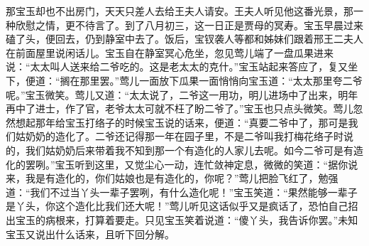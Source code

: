 \begin{parag}
    那宝玉却也不出房门，天天只差人去给王夫人请安。王夫人听见他这番光景，那一种欣慰之情，更不待言了。到了八月初三，这一日正是贾母的冥寿。宝玉早晨过来磕了头，便回去，仍到静室中去了。饭后，宝钗袭人等都和姊妹们跟着邢王二夫人在前面屋里说闲话儿。宝玉自在静室冥心危坐，忽见莺儿端了一盘瓜果进来说：“太太叫人送来给二爷吃的。这是老太太的克什。”宝玉站起来答应了，复又坐下，便道：“搁在那里罢。”莺儿一面放下瓜果一面悄悄向宝玉道：“太太那里夸二爷呢。”宝玉微笑。莺儿又道：“太太说了，二爷这一用功，明儿进场中了出来，明年再中了进士，作了官，老爷太太可就不枉了盼二爷了。”宝玉也只点头微笑。莺儿忽然想起那年给宝玉打络子的时候宝玉说的话来，便道：“真要二爷中了，那可是我们姑奶奶的造化了。二爷还记得那一年在园子里，不是二爷叫我打梅花络子时说的，我们姑奶奶后来带着我不知到那一个有造化的人家儿去呢。如今二爷可是有造化的罢咧。”宝玉听到这里，又觉尘心一动，连忙敛神定息，微微的笑道：“据你说来，我是有造化的，你们姑娘也是有造化的，你呢？”莺儿把脸飞红了，勉强道：“我们不过当丫头一辈子罢咧，有什么造化呢！”宝玉笑道：“果然能够一辈子是丫头，你这个造化比我们还大呢！”莺儿听见这话似乎又是疯话了，恐怕自己招出宝玉的病根来，打算着要走。只见宝玉笑着说道：“傻丫头，我告诉你罢。”未知宝玉又说出什么话来，且听下回分解。
\end{parag}